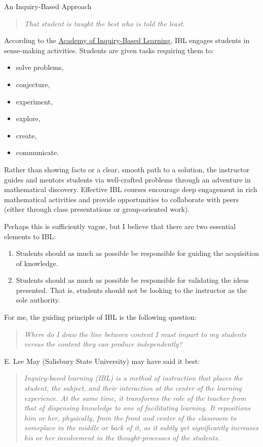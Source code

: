 \begin{section*}{An Inquiry-Based Approach}
\begin{quote}
\emph{That student is taught the best who is told the least.}
\end{quote}

According to the \href{http://www.inquirybasedlearning.org}{Academy of Inquiry-Based Learning}, IBL engages students in sense-making activities.  Students are given tasks requiring them to:
\begin{itemize}
\item solve problems,
\item conjecture,
\item experiment,
\item explore,
\item create,
\item communicate.
\end{itemize}

\noindent Rather than showing facts or a clear, smooth path to a solution, the instructor guides and mentors students via well-crafted problems through an adventure in mathematical discovery.  Effective IBL courses encourage deep engagement in rich mathematical activities and provide opportunities to collaborate with peers (either through class presentations or group-oriented work).

Perhaps this is sufficiently vague, but I believe that there are two essential elements to IBL:

\begin{enumerate}
\item Students should as much as possible be responsible for guiding the acquisition of knowledge.
\item Students should as much as possible be responsible for validating the ideas presented.  That is, students should not be looking to the instructor as the sole authority.
\end{enumerate}

\noindent For me, the guiding principle of IBL is the following question:

\begin{quote}
\emph{Where do I draw the line between content I must impart to my students versus the content they can produce independently?}
\end{quote}

\noindent E. Lee May (Salisbury State University) may have said it best:

\begin{quote}
\emph{Inquiry-based learning (IBL) is a method of instruction that places the student, the subject, and their interaction at the center of the learning experience.  At the same time, it transforms the role of the teacher from that of dispensing knowledge to one of facilitating learning.  It repositions him or her, physically, from the front and center of the classroom to someplace in the middle or back of it, as it subtly yet significantly increases his or her involvement in the thought-processes of the students.}
\end{quote}


\end{section*}
